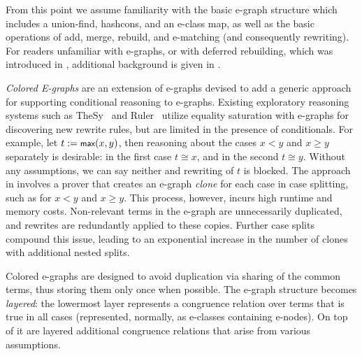 From this point we assume familiarity with the basic e-graph structure which includes a union-find, hashcons, and an e-class map, as well as the basic operations of add, merge, rebuild, and e-matching (and consequently rewriting).
For readers unfamiliar with e-graphs, or with deferred rebuilding, which was introduced in \cite{egg}, additional background is given in  . 

\emph{Colored E-graphs} are an extension of e-graphs devised to add a generic approach for supporting conditional reasoning to e-graphs.
Existing exploratory reasoning systems such as TheSy~\cite{thesy} and Ruler~\cite{ruler} utilize equality saturation with e-graphs for discovering new rewrite rules, but are limited in the presence of conditionals.
For example, let $t := \tmax(x, y)$, then reasoning about the cases $x < y$ and $x \geq y$ separately is desirable: in the first case $t \cong x$, and in the second $t \cong y$.
Without any assumptions, we can say neither and rewriting of $t$ is blocked.
The approach in \cite{thesy} involves a prover that creates an e-graph \emph{clone} for each case in case splitting, such as for $x < y$ and $x \geq y$. 
This process, however, incurs high runtime and memory costs. 
Non-relevant terms in the e-graph are unnecessarily duplicated, and rewrites are redundantly applied to these copies. 
Further case splits compound this issue, leading to an exponential increase in the number of clones with additional nested splits.


Colored e-graphs are designed to avoid duplication via sharing of the common terms, thus storing them only once when possible.
The e-graph structure becomes \emph{layered}:
the lowermost layer represents a congruence relation over terms that is true in all cases (represented, normally, as e-classes containing e-nodes).
On top of it are layered additional congruence relations that arise from various assumptions.


